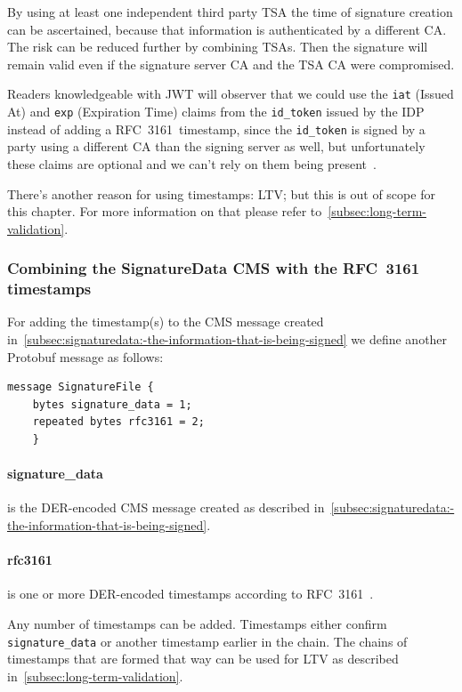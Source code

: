By using at least one independent third party \gls{TSA} the time of signature creation can be ascertained,
because that information is authenticated by a different \gls{CA}.
The risk can be reduced further by combining \gls{TSA}s.
Then the signature will remain valid even if the signature server \gls{CA} and the \gls{TSA} \gls{CA} were compromised.

Readers knowledgeable with \gls{JWT} will observer that we could use the \texttt{iat} (Issued At) and \texttt{exp} (Expiration Time)
claims from the \texttt{id\_token} issued by the \gls{IDP} instead of adding a RFC~3161~timestamp,
since the \texttt{id\_token} is signed by a party using a different \gls{CA} than the signing server as well,
but unfortunately these claims are optional and we can't rely on them being present~\cite[Sections 4.1.4 and 4.1.6]{rfc7519}.

There's another reason for using timestamps: \glsdesc{LTV}; but this is out of scope for this chapter.
For more information on that please refer to~\ref{subsec:long-term-validation}.

\subsubsection{Combining the SignatureData CMS with the RFC~3161 timestamps}
For adding the timestamp(s) to the \gls{CMS} message created in~\ref{subsec:signaturedata:-the-information-that-is-being-signed}
we define another Protobuf message as follows:

\begin{lstlisting}[caption={SignatureFile message}, captionpos=b, label={lst:signaturefileschema}]
    message SignatureFile {
    bytes signature_data = 1;
    repeated bytes rfc3161 = 2;
    }
\end{lstlisting}

\paragraph{signature\_data} is the \gls{DER}-encoded \gls{CMS} message created as described in~\ref{subsec:signaturedata:-the-information-that-is-being-signed}.
\paragraph{rfc3161} is one or more \gls{DER}-encoded timestamps according to RFC~3161~\cite{rfc3161}.

Any number of timestamps can be added.
Timestamps either confirm \texttt{signature\_data} or another timestamp earlier in the chain.
The chains of timestamps that are formed that way can be used for \gls{LTV} as described in~\ref{subsec:long-term-validation}.

